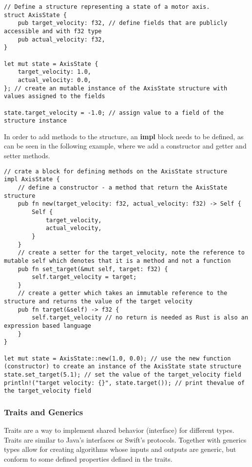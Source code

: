 \begin{lstlisting}
// Define a structure representing a state of a motor axis.
struct AxisState {
    pub target_velocity: f32, // define fields that are publicly accessible and with f32 type
    pub actual_velocity: f32,
}

let mut state = AxisState {
    target_velocity: 1.0,
    actual_velocity: 0.0,
}; // create an mutable instance of the AxisState structure with values assigned to the fields

state.target_velocity = -1.0; // assign value to a field of the structure instance
\end{lstlisting}

In order to add methods to the structure, an \textbf{impl} block needs to be defined, as can be seen in the following example, where we add a constructor and getter and setter methods.
\newpage
\begin{lstlisting}
// crate a block for defining methods on the AxisState structure
impl AxisState {
    // define a constructor - a method that return the AxisState structure
    pub fn new(target_velocity: f32, actual_velocity: f32) -> Self {
        Self {
            target_velocity,
            actual_velocity,
        }
    }
    // create a setter for the target_velocity, note the reference to mutable self which denotes that it is a method and not a function
    pub fn set_target(&mut self, target: f32) {
        self.target_velocity = target;
    }
    // create a getter which takes an immutable reference to the structure and returns the value of the target velocity
    pub fn target(&self) -> f32 {
        self.target_velocity // no return is needed as Rust is also an expression based language
    }
}

let mut state = AxisState::new(1.0, 0.0); // use the new function (constructor) to create an instance of the AxisState state structure
state.set_target(5.1); // set the value of the target_velocity field
println!("target velocity: {}", state.target()); // print thevalue of the target_velocity field
\end{lstlisting}

\subsubsection{Traits and Generics}
Traits are a way to implement shared behavior (interface) for different types.
Traits are similar to Java's interfaces or Swift's protocols.
Together with generics types allow for creating algorithms whose inputs and outputs are generic, but conform to some defined properties defined in the traits.

